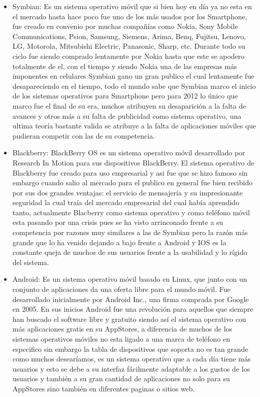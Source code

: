 \documentclass[11pt]{book}
\begin{document}
\begin{itemize}
\item Symbian: Es un sistema operativo móvil que si bien hoy en día ya no esta en el mercado hasta hace poco fue uno de los más usados por los \gls{Smartphone}, fue creado en convenio por muchas compañías como Nokia, Sony Mobile Communications, Psion, Samsung, Siemens, Arima, Benq, Fujitsu, Lenovo, LG, Motorola, Mitsubishi Electric, Panasonic, Sharp, etc. Durante todo su ciclo fue siendo comprado lentamente por Nokia hasta que este se apodero totalmente de el, con el tiempo y siendo Nokia una de las empresas más imponentes en celulares Symbian gano un gran publico el cual lentamente fue desapareciendo en el tiempo, todo el mundo sabe que Symbian marco el inicio de los sistemas operativos para \gls{Smartphone} pero para 2012 lo único que marco fue el final de su era, muchos atribuyen su desaparición a la falta de avances y otros más a su falta de publicidad como sistema operativo, una ultima teoría bastante valida se atribuye a la falta de aplicaciones móviles que pudieran competir con las de su competencia.

\item Blackberry: BlackBerry OS es un sistema operativo móvil desarrollado por Research In Motion para sus dispositivos BlackBerry. El sistema operativo de Blackberry fue creado para uso empresarial y asi fue que se hizo famoso sin embargo cuando salio al mercado para el publico en general fue bien recibido por sus dos grandes ventajas: el servicio de mensajería y su impresionante seguridad la cual traía del mercado empresarial del cual había aprendido tanto, actualmente Blacberry como sistema operativo y como teléfono móvil esta pasando por una crisis pues se ha visto arrinconado frente a su competencia por razones muy similares a las de Symbian pero la razón más grande que lo ha venido dejando a bajo frente a Android y IOS es la constante queja de muchos de sus usuarios frente a la usabilidad y lo rígido del sistema.

\item Android: Es un sistema operativo móvil basado en Linux, que junto con un conjunto de aplicaciones da una oferta libre para el mundo móvil. Fue desarrollado inicialmente por Android Inc., una firma comprada por Google en 2005. En sus inicios Android fue una revolución para aquellos que siempre han buscado el software libre y gratuito siendo así el sistema operativo con más aplicaciones gratis en su \gls{AppStores}, a diferencia de muchos de los sistemas operativos móviles no esta ligado a una marca de teléfono en especifico sin embargo la tabla de dispositivos que soporta no es tan grande como muchos desearíamos, es un sistema operativo que a cada día tiene más usuarios y esto se debe a su interfaz fácilmente adaptable a los gustos de los usuarios y también a su gran cantidad de aplicaciones no solo para su \gls{AppStores} sino también en diferentes paginas o sitios web.


\end{itemize}
\end{document}
